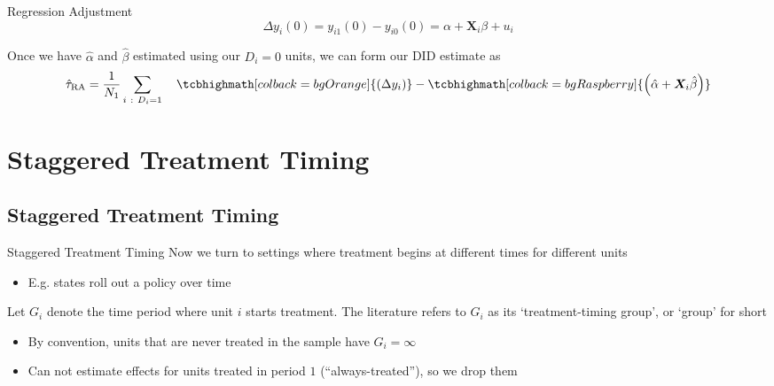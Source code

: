 \documentclass[aspectratio=169,t,11pt,table]{beamer}
\begin{document}
\begin{frame}{Regression Adjustment}
  \vspace*{-\bigskipamount}
  $$
    \Delta y_i(0) = y_{i1}(0) - y_{i0}(0) = \alpha + \bm{X}_i \beta + u_i
  $$
  
  \bigskip
  Once we have $\hat{\alpha}$ and $\hat{\beta}$ estimated using our $D_i = 0$ units, we can form our DID estimate as 
  $$
    \hat{\tau}_{\text{RA}} 
    = \frac{1}{N_1} \sum_{i \ : \ D_i = 1} \quad
    \tcbhighmath[colback = bgOrange]{\left( \Delta y_i \right) }
    - \tcbhighmath[colback = bgRaspberry]{\left( \hat{\alpha} + \bm{X}_i \hat{\beta} \right)}
  $$

\end{frame}




\section{Staggered Treatment Timing}

\subsection{Staggered Treatment Timing}

\begin{frame}{Staggered Treatment Timing}
  Now we turn to settings where treatment begins at different times for different units
  \begin{itemize}
    \item E.g. states roll out a policy over time
  \end{itemize}

  \bigskip
  Let $G_i$ denote the time period where unit $i$ starts treatment. The literature refers to $G_i$ as its `treatment-timing group', or `group' for short
  \begin{itemize}
    \item By convention, units that are never treated in the sample have $G_i = \infty$
    
    \item Can not estimate effects for units treated in period $1$  (``always-treated''), so we drop them
  \end{itemize} 
\end{frame}
\end{document}
